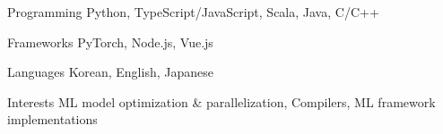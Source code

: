 

\begin{cvskills}

  \cvskill
  {Programming} %
  {Python, TypeScript/JavaScript, Scala, Java, C/C++} %

  \cvskill
  {Frameworks} %
  {PyTorch, Node.js, Vue.js} %

  \cvskill
  {Languages} %
  {Korean, English, Japanese} %

  \cvskill
  {Interests} %
  {ML model optimization \& parallelization, Compilers, ML framework implementations} %

\end{cvskills}
